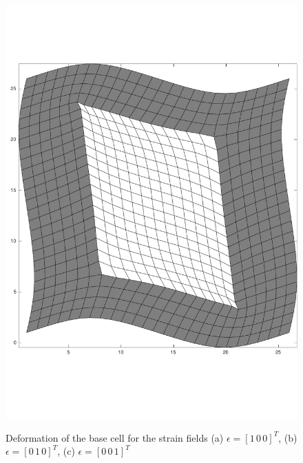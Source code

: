 \documentclass[openright,twoside]{iitkthesis}
\begin{document}
\begin{figure}[H]
\begin{center}
{        \includegraphics[trim=0cm 4cm 0cm 6cm,scale=.22]{./Plots/pbc/3}
     }
    \label{fig:pbc1}
    \caption{Deformation of the base cell for the strain fields (a) $\epsilon = [1\,0\,0]^T$, (b) $\epsilon = [0\,1\,0]^T$, (c) $\epsilon = [0\,0\,1]^T$}
\end{center}
\end{figure}
\end{document}
